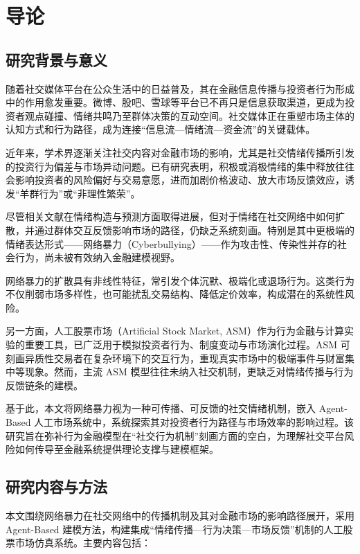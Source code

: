 \chapter{导论}

\section{研究背景与意义}

随着社交媒体平台在公众生活中的日益普及，其在金融信息传播与投资者行为形成中的作用愈发重要。微博、股吧、雪球等平台已不再只是信息获取渠道，更成为投资者观点碰撞、情绪共鸣乃至群体决策的互动空间。社交媒体正在重塑市场主体的认知方式和行为路径，成为连接“信息流—情绪流—资金流”的关键载体。

近年来，学术界逐渐关注社交内容对金融市场的影响，尤其是社交情绪传播所引发的投资行为偏差与市场异动问题。已有研究表明，积极或消极情绪的集中释放往往会影响投资者的风险偏好与交易意愿，进而加剧价格波动、放大市场反馈效应，诱发“羊群行为”或“非理性繁荣”。

尽管相关文献在情绪构造与预测方面取得进展，但对于情绪在社交网络中如何扩散，并通过群体交互反馈影响市场的路径，仍缺乏系统刻画。特别是其中更极端的情绪表达形式——网络暴力（Cyberbullying）——作为攻击性、传染性并存的社会行为，尚未被有效纳入金融建模视野。

网络暴力的扩散具有非线性特征，常引发个体沉默、极端化或退场行为。这类行为不仅削弱市场多样性，也可能扰乱交易结构、降低定价效率，构成潜在的系统性风险。

另一方面，人工股票市场（Artificial Stock Market, ASM）作为行为金融与计算实验的重要工具，已广泛用于模拟投资者行为、制度变动与市场演化过程。ASM 可刻画异质性交易者在复杂环境下的交互行为，重现真实市场中的极端事件与财富集中等现象。然而，主流 ASM 模型往往未纳入社交机制，更缺乏对情绪传播与行为反馈链条的建模。

基于此，本文将网络暴力视为一种可传播、可反馈的社交情绪机制，嵌入 Agent-Based 人工市场系统中，系统探索其对投资者行为路径与市场效率的影响过程。该研究旨在弥补行为金融模型在“社交行为机制”刻画方面的空白，为理解社交平台风险如何传导至金融系统提供理论支撑与建模框架。

\section{研究内容与方法}

本文围绕网络暴力在社交网络中的传播机制及其对金融市场的影响路径展开，采用 Agent-Based 建模方法，构建集成“情绪传播—行为决策—市场反馈”机制的人工股票市场仿真系统。主要内容包括：

